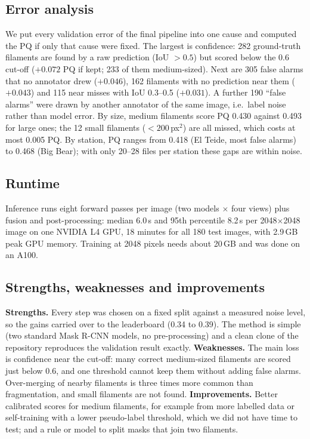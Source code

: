 \subsection{Error analysis}
We put every validation error of the final pipeline into one cause and computed the PQ if only that cause were
fixed. The largest is confidence: 282 ground-truth filaments are found by a raw prediction (IoU $>0.5$) but scored
below the 0.6 cut-off ($+0.072$ PQ if kept; 233 of them medium-sized). Next are 305 false alarms that no annotator
drew ($+0.046$), 162 filaments with no prediction near them ($+0.043$) and 115 near misses with IoU 0.3--0.5
($+0.031$). A further 190 ``false alarms'' were drawn by another annotator of the same image, i.e.\ label noise
rather than model error.
By size, medium filaments score PQ 0.430 against 0.493 for large ones; the 12 small filaments ($<200$\,px$^2$)
are all missed, which costs at most 0.005 PQ. By station, PQ ranges from 0.418 (El Teide, most false alarms) to
0.468 (Big Bear); with only 20--28 files per station these gaps are within noise.

\subsection{Runtime}
Inference runs eight forward passes per image (two models $\times$ four views) plus fusion and post-processing:
median 6.0\,s and 95th percentile 8.2\,s per 2048$\times$2048 image on one NVIDIA L4 GPU, 18 minutes for all 180
test images, with 2.9\,GB peak GPU memory. Training at 2048 pixels needs about 20\,GB and was done on an A100.

\subsection{Strengths, weaknesses and improvements}
\textbf{Strengths.} Every step was chosen on a fixed split against a measured noise level, so the gains carried
over to the leaderboard (0.34 to 0.39). The method is simple (two standard Mask R-CNN models, no pre-processing) and
a clean clone of the repository reproduces the validation result exactly.
\textbf{Weaknesses.} The main loss is confidence near the cut-off: many correct medium-sized filaments are scored
just below 0.6, and one threshold cannot keep them without adding false alarms. Over-merging of nearby filaments is
three times more common than fragmentation, and small filaments are not found.
\textbf{Improvements.} Better calibrated scores for medium filaments, for example from more labelled data or
self-training with a lower pseudo-label threshold, which we did not have time to test; and a rule or model to
split masks that join two filaments.
